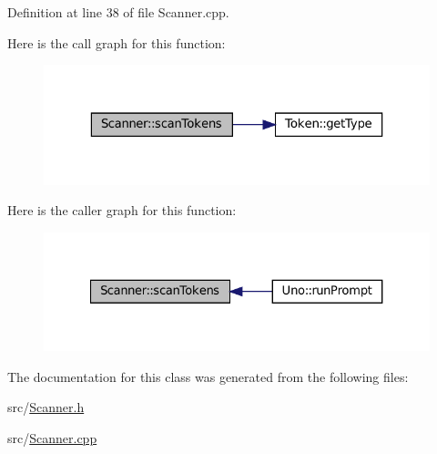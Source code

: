 Definition at line 38 of file Scanner.\+cpp.

Here is the call graph for this function\+:
\nopagebreak
\begin{figure}[H]
\begin{center}
\leavevmode
\includegraphics[width=323pt]{classScanner_a38e0f484bb3539944d6809c552f1da0b_cgraph}
\end{center}
\end{figure}
Here is the caller graph for this function\+:
\nopagebreak
\begin{figure}[H]
\begin{center}
\leavevmode
\includegraphics[width=327pt]{classScanner_a38e0f484bb3539944d6809c552f1da0b_icgraph}
\end{center}
\end{figure}


The documentation for this class was generated from the following files\+:\begin{DoxyCompactItemize}
\item 
src/\hyperlink{Scanner_8h}{Scanner.\+h}\item 
src/\hyperlink{Scanner_8cpp}{Scanner.\+cpp}\end{DoxyCompactItemize}
